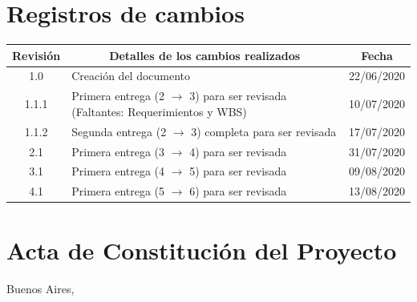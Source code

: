 \documentclass[11pt]{charter}
\begin{document}
\maketitle
\thispagestyle{empty}
\pagebreak


\thispagestyle{empty}
{\setlength{\parskip}{0pt}
\tableofcontents{}
}
\pagebreak


\section{Registros de cambios}
\label{sec:registro}


\begin{table}[ht]
\label{tab:registro}
\centering

\begin{tabularx}{\linewidth}{@{}|c|X|c|@{}}
\hline
\rowcolor[HTML]{C0C0C0} 
Revisión & \multicolumn{1}{c|}{\cellcolor[HTML]{C0C0C0}Detalles de los cambios realizados} & Fecha      \\ \hline
1.0      & Creación del documento                                                          & 22/06/2020 \\ \hline
1.1.1      & Primera entrega (2 $\rightarrow$ 3) para ser revisada (Faltantes: Requerimientos y WBS) & 10/07/2020 \\ \hline
1.1.2      & Segunda entrega (2 $\rightarrow$ 3) completa para ser revisada  & 17/07/2020 \\ \hline
2.1      & Primera entrega (3 $\rightarrow$ 4) para ser revisada  & 31/07/2020 \\ \hline
3.1      & Primera entrega (4 $\rightarrow$ 5) para ser revisada  & 09/08/2020 \\ \hline
4.1      & Primera entrega (5 $\rightarrow$ 6) para ser revisada  & 13/08/2020 \\ \hline

\end{tabularx}
\end{table}

\pagebreak


\section{Acta de Constitución del Proyecto}
\label{sec:acta}

\begin{flushright}
Buenos Aires, \fechaInicioName
\end{flushright}

\vspace{2cm}
\end{document}
